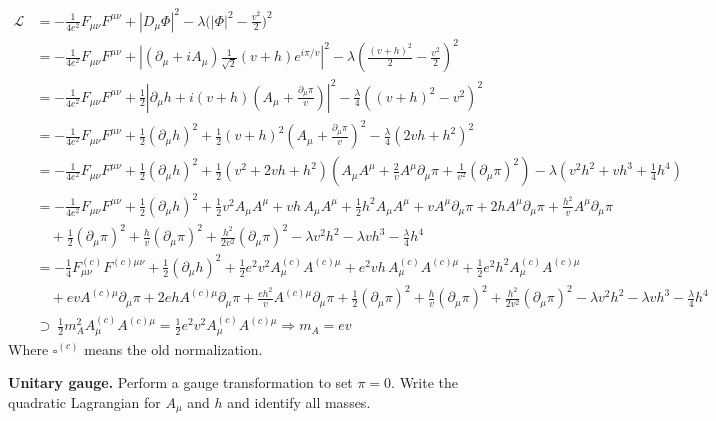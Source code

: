 \begin{solution}[23.1]
$$
\begin{aligned}
	\mathcal{L}
	&= -\frac1{4e^2}F_{\mu\nu}F^{\mu\nu}+|D_\mu\Phi|^2-\lambda\Big(|\Phi|^2-\frac{v^2}2\Big)^2 \\
	&= -\frac1{4e^2}F_{\mu\nu}F^{\mu\nu}
	+\left|(\partial_\mu+iA_\mu)\frac1{\sqrt2}(v+h)e^{i\pi/v}\right|^2
	-\lambda\left(\frac{(v+h)^2}{2}-\frac{v^2}{2}\right)^2 \\
	&= -\frac1{4e^2}F_{\mu\nu}F^{\mu\nu}
	+\frac12\left|\partial_\mu h+i(v+h)\left(A_\mu+\frac{\partial_\mu\pi}{v}\right)\right|^2
	-\frac{\lambda}{4}\left((v+h)^2-v^2\right)^2 \\
	&= -\frac1{4e^2}F_{\mu\nu}F^{\mu\nu}
	+\frac12(\partial_\mu h)^2+\frac12(v+h)^2\left(A_\mu+\frac{\partial_\mu\pi}{v}\right)^2
	-\frac{\lambda}{4}(2vh+h^2)^2 \\
	&= -\frac1{4e^2}F_{\mu\nu}F^{\mu\nu}
	+\frac12(\partial_\mu h)^2
	+\frac12(v^2+2vh+h^2)\left(A_\mu A^\mu+\frac{2}{v}A^\mu\partial_\mu\pi+\frac1{v^2}(\partial_\mu\pi)^2\right)
	-\lambda\left(v^2h^2+vh^3+\frac14h^4\right) \\
	&= -\frac1{4e^2}F_{\mu\nu}F^{\mu\nu}
	+\frac12(\partial_\mu h)^2
	+\frac12v^2A_\mu A^\mu+vh\,A_\mu A^\mu+\frac12h^2A_\mu A^\mu
	+vA^\mu\partial_\mu\pi+2hA^\mu\partial_\mu\pi+\frac{h^2}{v}A^\mu\partial_\mu\pi \\
	&\quad +\frac12(\partial_\mu\pi)^2+\frac{h}{v}(\partial_\mu\pi)^2+\frac{h^2}{2v^2}(\partial_\mu\pi)^2
	-\lambda v^2h^2-\lambda vh^3-\frac{\lambda}{4}h^4 \\
	&= -\frac14F^{(c)}_{\mu\nu}F^{(c)\mu\nu}
	+\frac12(\partial_\mu h)^2
	+\frac12e^2v^2A^{(c)}_\mu A^{(c)\mu}+e^2vh\,A^{(c)}_\mu A^{(c)\mu}+\frac12e^2h^2A^{(c)}_\mu A^{(c)\mu} \\
	&\quad +evA^{(c)\mu}\partial_\mu\pi+2ehA^{(c)\mu}\partial_\mu\pi+\frac{eh^2}{v}A^{(c)\mu}\partial_\mu\pi
	+\frac12(\partial_\mu\pi)^2+\frac{h}{v}(\partial_\mu\pi)^2+\frac{h^2}{2v^2}(\partial_\mu\pi)^2
	-\lambda v^2h^2-\lambda vh^3-\frac{\lambda}{4}h^4 \\
	&\supset\ \frac12 m_A^2 A^{(c)}_\mu A^{(c)\mu}=\frac12 e^2v^2A^{(c)}_\mu A^{(c)\mu}\Rightarrow\boxed{ m_A=ev}
\end{aligned}
$$
Where $\square^{(c)}$ means the old normalization.
\end{solution}
\begin{problem}
    \textbf{Unitary gauge.} Perform a gauge transformation to set \(\pi=0\). Write the quadratic Lagrangian for \(A_\mu\) and \(h\) and identify all masses.
\end{problem}
